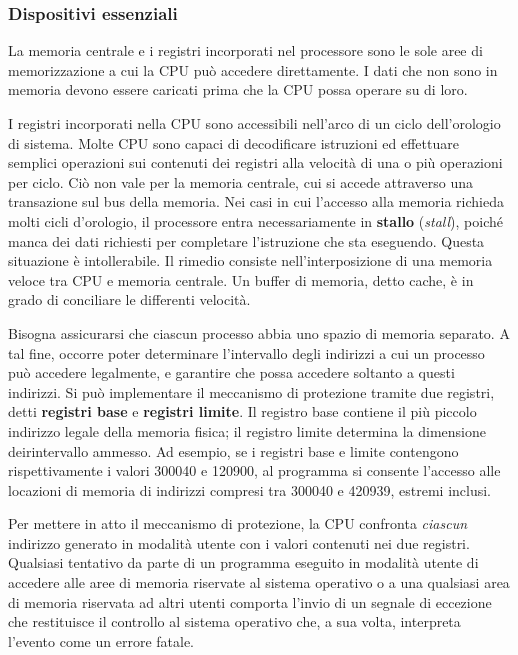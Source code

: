 \documentclass[11pt,a4paper]{article}
\begin{document}
\subsubsection{Dispositivi essenziali}
La memoria centrale e i registri incorporati nel processore sono le sole aree di memorizza­zione a cui la CPU può accedere direttamente.
I dati che non sono in
memoria devono essere caricati prima che la CPU possa operare su di loro.

I registri incorporati nella CPU sono accessibili nell'arco di un ciclo dell'orolo­gio di sistema. Molte CPU sono capaci di decodificare istruzioni ed effettuare semplici opera­zioni sui contenuti dei registri alla velocità di una o più operazioni per ciclo. Ciò non vale per
la memoria centrale, cui si accede attraverso una transazione sul bus della memoria. Nei casi in
cui l'accesso alla memoria richieda molti cicli d'orologio, il processore entra necessariamente in
\textbf{stallo} (\emph{stall}), poiché manca dei dati richiesti per completare l'istruzione che sta eseguendo.
Questa situazione è intollerabile. Il rimedio
consiste nell'interposizione di una memoria veloce tra CPU e memoria centrale. Un buffer di
memoria, detto cache, è in grado di conciliare le differenti velocità.

Bisogna assicurarsi che ciascun processo abbia uno spazio di memoria se­parato. A tal fine, occorre poter determinare l'intervallo degli indirizzi a cui un processo può
accedere legalmente, e garantire che possa accedere soltanto a questi indirizzi. Si può imple­mentare il meccanismo di protezione tramite due registri, detti \textbf{registri base} e \textbf{registri limite}.
Il registro base contiene il più piccolo indirizzo legale
della memoria fisica; il registro limite determina la dimensione deirintervallo ammesso. Ad
esempio, se i registri base e limite contengono rispettivamente i valori 300040 e 120900, al
programma si consente l'accesso alle locazioni di memoria di indirizzi compresi tra 300040
e 420939, estremi inclusi.

Per mettere in atto il meccanismo di protezione, la CPU confronta \emph{ciascun} indirizzo ge­nerato in modalità utente con i valori contenuti nei due registri. Qualsiasi tentativo da par­te di un programma eseguito in modalità utente di accedere alle aree di memoria riservate al
sistema operativo o a una qualsiasi area di memoria riservata ad altri utenti comporta l'invio
di un segnale di eccezione che restituisce il controllo al sistema operativo che, a sua volta, in­terpreta l'evento come un errore fatale.
\end{document}
